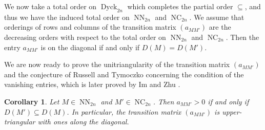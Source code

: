\documentclass[reqno,12pt]{amsart}
\newtheorem{cor}[thm]{Corollary}
\theoremstyle{definition}
\theoremstyle{remark}
\newcommand\Dyck{\operatorname{Dyck}}
\newcommand\NC{\operatorname{NC}}
\newcommand\NN{\operatorname{NN}}
\begin{document}
We now take a total order on \( \Dyck_{2n} \) which completes the partial order
\( \subseteq \), and thus we have the induced total order on
\( \NN_{2n} \) and \( \NC_{2n} \).
We assume that orderings of rows and columns of the transition matrix
\( (a_{MM'}) \) are the decreasing orders with respect to the total order
on \( \NN_{2n} \) and \( \NC_{2n} \).
Then the entry \( a_{MM'} \) is on the diagonal if and only if \( D(M)=D(M') \).

We are now ready to prove the unitriangularity of the transition matrix
$(a_{MM'})$ and the conjecture of Russell and Tymoczko
\cite[Conjecture 5.8]{RT19} concerning the condition of the vanishing entries,
which is later proved by Im and Zhu \cite[Theorem 1.1]{IZ22}.

\begin{cor}\label{Cor: unitriangularity}\cite{RT19,IZ22}
  Let \( M\in\NN_{2n} \) and \( M'\in\NC_{2n} \).
  Then \( a_{MM'} > 0 \) if and only if \( D(M') \subseteq D(M) \).
  In particular, the transition matrix $(a_{MM'})$ is upper-triangular with ones along the diagonal.
\end{cor}
\end{document}
